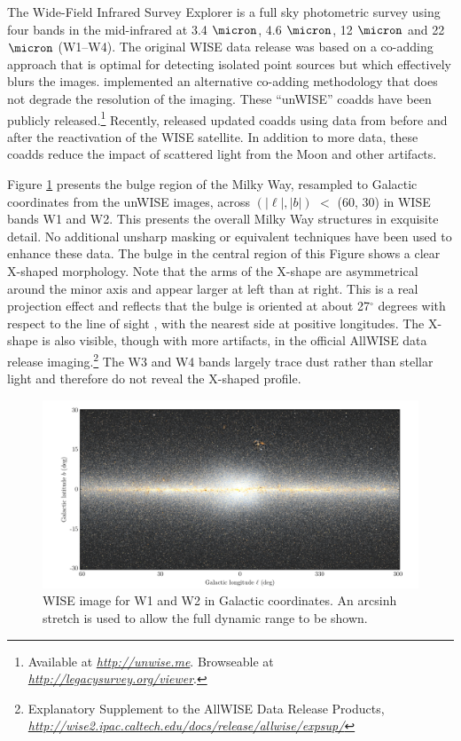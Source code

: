 \documentclass[12pt, preprint]{aastex}
\newcommand{\niceurl}[1]{\href{#1}{\textsl{#1}}}
\newcommand{\viewerurl}{\niceurl{http://legacysurvey.org/viewer}}
\begin{document}
The Wide-Field Infrared Survey Explorer \citep[WISE;][]{W2010} is a full sky photometric survey using four bands in the mid-infrared at 3.4 $\micron$, 4.6 $\micron$, 12 $\micron$ and 22 $\micron$ (W1--W4). The original WISE data release was based on a co-adding approach that is optimal for detecting isolated point sources but which effectively blurs the images. \citet{Lang2014a} implemented an alternative co-adding methodology that does not degrade the resolution of the imaging.  These ``unWISE'' coadds have been publicly released.\footnote{Available at \niceurl{http://unwise.me}. Browseable at \viewerurl.}  Recently, \citet{Meisner2016} released updated coadds using data from before and after the reactivation of the WISE satellite.  In addition to more data, these coadds reduce the impact of scattered light from the Moon and other artifacts.

Figure \ref{fig:xbulge} presents the bulge region of the Milky Way,  resampled to Galactic coordinates from the unWISE images, across $(|\ell|,|b|)$ $<$ (60, 30) in WISE bands W1 and W2.  This presents the overall Milky Way structures in exquisite detail.
No additional unsharp masking or equivalent techniques have been used to enhance these data. The bulge in the central region of this Figure shows a clear X-shaped morphology. Note that the arms of the X-shape are asymmetrical around the minor axis and appear larger at left than at right. This is a real projection effect and reflects that the bulge is oriented at about 27$^\circ$ degrees with respect to the line of sight \citep{Wegg2013}, with the nearest side at positive longitudes. The X-shape is also visible, though with more artifacts, in the official AllWISE data release imaging.\footnote{Explanatory
  Supplement to the AllWISE Data Release Products, 
  \niceurl{http://wise2.ipac.caltech.edu/docs/release/allwise/expsup/}}
%
The W3 and W4 bands largely trace dust rather than stellar light and therefore
do not reveal the X-shaped profile.

\begin{figure}[h!]
\centering
        \includegraphics[width=\textwidth]{xbulge-00}
\caption{WISE image for W1 and W2 in Galactic coordinates.  An arcsinh
  stretch is used to allow the full dynamic range to be shown.}
\label{fig:xbulge}
\end{figure}
\end{document}
